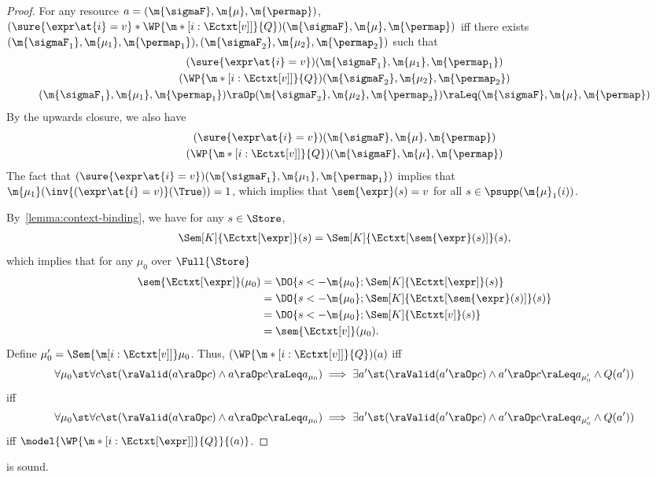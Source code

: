\begin{proof}
  For any resource $a = (\m{\sigmaF}, \m{\mu}, \m{\permap})$,
  $(\sure{\expr\at{i}=v} * \WP{\m*[i: {\Ectxt[v]}]}{Q})(\m{\sigmaF}, \m{\mu}, \m{\permap})$ iff
    there exists $(\m{\sigmaF_1}, \m{\mu_1}, \m{\permap_1}), (\m{\sigmaF_2}, \m{\mu_2}, \m{\permap_2})$ such that
\begin{gather*}
      (\sure{\expr\at{i}=v})(\m{\sigmaF_1}, \m{\mu_1}, \m{\permap_1})\\
      (\WP{\m*[i: {\Ectxt[v]}]}{Q})(\m{\sigmaF_2}, \m{\mu_2}, \m{\permap_2})\\
      (\m{\sigmaF_1}, \m{\mu_1}, \m{\permap_1}) \raOp  (\m{\sigmaF_2}, \m{\mu_2}, \m{\permap_2})
      \raLeq (\m{\sigmaF}, \m{\mu}, \m{\permap})
    \end{gather*}
By the upwards closure, we also have
    \begin{gather*}
      (\sure{\expr\at{i}=v})(\m{\sigmaF}, \m{\mu}, \m{\permap}) \\
      (\WP{\m*[i: {\Ectxt[v]}]}{Q})(\m{\sigmaF}, \m{\mu}, \m{\permap})
    \end{gather*}
The fact that $(\sure{\expr\at{i}=v})(\m{\sigmaF_1}, \m{\mu_1}, \m{\permap_1})$
    implies that $\m{\mu_1}(\inv{(\expr\at{i}=v)} (\True)) = 1$,
    which implies that
    $\sem{\expr}(s) = v$ for all $s \in \psupp(\m{\mu}_1(i))$.


    By~\cref{lemma:context-binding}, we have for any $s \in \Store$,
    \begin{align*}
      \Sem[K]{\Ectxt[\expr]}(s) = \Sem[K]{\Ectxt[\sem{\expr}(s)]}(s),
    \end{align*}
    which implies that for any $\mu_0$ over $\Full{\Store}$
    \begin{align*}
      \sem{\Ectxt[\expr]}(\mu_0)
      &= \DO{
        s <- \m{\mu_0};
        \Sem[K]{\Ectxt[\expr]}(s)
      }\\
      &= \DO{
        s <- \m{\mu_0};
        \Sem[K]{\Ectxt[\sem{\expr}(s)]}(s)
      }\\
      &= \DO{
        s <- \m{\mu_0};
        \Sem[K]{\Ectxt[v]}(s)
      }\\
      &= \sem{\Ectxt[v]}(\mu_0).
    \end{align*}
Define $\mu'_0 = \Sem{\m[i: {\Ectxt[v]}]} \mu_0$.
    Thus, $(\WP{\m*[i: {\Ectxt[v]}]}{Q})(a)$ iff
\begin{align*}
  \forall \mu_0 \st
    \forall c\st
    (\raValid(a \raOp c) \land  a\raOp c \raLeq  a_{\mu_0})
      \implies
        \exists a'\st
        (\raValid(a' \raOp c) \land  a'\raOp c \raLeq  a_{\mu'_0} \land Q(a'))
\end{align*}
iff
\begin{align*}
  \forall \mu_0 \st
    \forall c\st
    (\raValid(a \raOp c) \land  a\raOp c \raLeq  a_{\mu_0})
      \implies
        \exists a'\st
        (\raValid(a' \raOp c) \land  a'\raOp c \raLeq  a_{\mu'_0} \land Q(a'))
\end{align*}
iff $\model{\WP{\m*[i: {\Ectxt[\expr]}]}{Q}}{(a)}$.
\end{proof}
 \begin{lemma}
\label{proof:wp-loop-unf}
   is sound.
\end{lemma}

